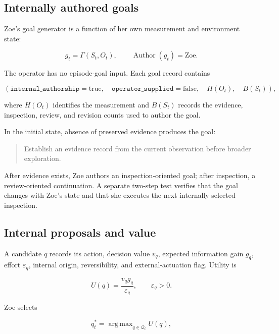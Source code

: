 \documentclass[11pt,a4paper]{article}
\begin{document}
\subsection{Internally authored goals}
Zoe's goal generator is a function of her own measurement and environment state:

\begin{equation}
g_t=\Gamma(S_t,O_t),\qquad
\operatorname{Author}(g_t)=\mathrm{Zoe}.
\end{equation}

The operator has no episode-goal input. Each goal record contains

\begin{equation}
(\texttt{internal\_authorship}=\mathrm{true},\quad
\texttt{operator\_supplied}=\mathrm{false},\quad
H(O_t),\quad B(S_t)),
\end{equation}

where $H(O_t)$ identifies the measurement and $B(S_t)$ records the evidence, inspection, review, and revision counts used to author the goal.

In the initial state, absence of preserved evidence produces the goal:

\begin{quote}
Establish an evidence record from the current observation before broader exploration.
\end{quote}

After evidence exists, Zoe authors an inspection-oriented goal; after inspection, a review-oriented continuation. A separate two-step test verifies that the goal changes with Zoe's state and that she executes the next internally selected inspection.

\subsection{Internal proposals and value}
A candidate $q$ records its action, decision value $v_q$, expected information gain $g_q$, effort $\varepsilon_q$, internal origin, reversibility, and external-actuation flag. Utility is

\begin{equation}
U(q)=\frac{v_qg_q}{\varepsilon_q},\qquad \varepsilon_q>0.
\end{equation}

Zoe selects

\begin{equation}
q_t^*=\operatorname{arg\,max}_{q\in\mathcal Q_t}U(q),
\end{equation}
\end{document}
